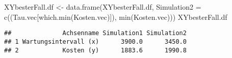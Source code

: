 \documentclass[
]{article}
\newenvironment{Shaded}{\begin{snugshade}}{\end{snugshade}}
\newcommand{\AttributeTok}[1]{\textcolor[rgb]{0.77,0.63,0.00}{#1}}
\newcommand{\FunctionTok}[1]{\textcolor[rgb]{0.00,0.00,0.00}{#1}}
\newcommand{\NormalTok}[1]{#1}
\newcommand{\OtherTok}[1]{\textcolor[rgb]{0.56,0.35,0.01}{#1}}
\begin{document}
\begin{Shaded}
\begin{Highlighting}[]
\NormalTok{XYbesterFall.df }\OtherTok{\textless{}{-}} \FunctionTok{data.frame}\NormalTok{(XYbesterFall.df, }\AttributeTok{Simulation2 =} \FunctionTok{c}\NormalTok{((Tau.vec[}\FunctionTok{which.min}\NormalTok{(Kosten.vec)]), }\FunctionTok{min}\NormalTok{(Kosten.vec)))}
\NormalTok{XYbesterFall.df}
\end{Highlighting}
\end{Shaded}

\begin{verbatim}
##              Achsenname Simulation1 Simulation2
## 1 Wartungsintervall (x)      3900.0      3450.0
## 2            Kosten (y)      1883.6      1990.8
\end{verbatim}
\end{document}
